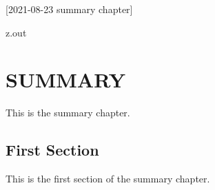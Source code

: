 [2021-08-23 summary chapter]

\begin{VerbatimOut}{z.out}
\chapter{SUMMARY}

This is the summary chapter.


\section{First Section}

This is the first section of the summary chapter.
\end{VerbatimOut}

\MyIO
